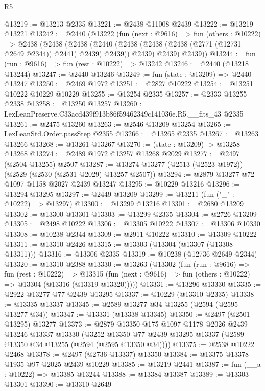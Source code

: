 \begin{lexlean}{R5}
\begin{coremodule}
@13219 := @13213 @2335
@13221 := @2438 @11008 @2439
@13222 := @13219 @13221
@13242 := @2440
    (@13222
      (fun (next : @9616) =>
      fun (others : @10222) =>
      @2438
        (@2438
          (@2438
            (@2440 (@2438 (@2438 (@2438 (@2771 (@12731 @2649 @2344)) @2441) @2439) @2439))
            @2439)
          @2439)
        @2439))
@13244 := fun (run : @9616) => fun (rest : @10222) => @13242
@13246 := @2440 (@13218 @13244)
@13247 := @2440 @13246
@13249 := fun (state : @13209) => @2440 @13247
@13250 := @2469 @1972
@13251 := @2827 @10222
@13254 := @13251 @10222 @10229 @10229
@13255 := @13254 @2335
@13257 := @2333 @13255 @2338
@13258 := @13250 @13257
@13260 := LexLeanPreserve.C33acd439f913b86f59462349c141036e.R5.__fits_43 @2335
@13261 := @2475 @13260
@13263 := @2546 @13209 @13254
@13265 := LexLeanStd.Order.passStep @2355
@13266 := @13265 @2335
@13267 := @13263 @13266
@13268 := @13261 @13267
@13270 := (state : @13209) -> @13258 @13268
@13274 := @2489 @1972 @13257 @13268 @2029
@13277 := @2497 (@2504 @13255) @2507
@13287 := @13274 @13277 (@2513 (@2523 @1972)) (@2529 (@2530 (@2531 @2029) @13257 @2507))
@13294 := @2879 @13277 @72 @1097 @1158 @2027 @2439 @13247
@13295 := @10229 @13216
@13296 := @13294 @13295
@13297 := @2449 @13209
@13299 := @13211 (fun ("_" : @10222) => @13297)
@13300 := @13299 @13216
@13301 := @2680 @13209
@13302 := @13300 @13301
@13303 := @13299 @2335
@13304 := @2726 @13209
@13305 := @2498 @10222
@13306 := @13305 @10222
@13307 := @13306 @10330
@13308 := @10238 @2344
@13309 := @2911 @10222
@13310 := @13309 @10222
@13311 := @13310 @2426
@13315 := @13303 (@13304 (@13307 (@13308 @13311)))
@13316 := @13306 @2335
@13319 := @10238 (@12736 @2649 @2344)
@13320 := @13310 @2388
@13330 := @13263
    (@13302
      (fun (run : @9616) =>
      fun (rest : @10222) =>
      @13315 (fun (next : @9616) => fun (others : @10222) => @13304 (@13316 (@13319 @13320)))))
@13331 := @13296 @13330
@13335 := @2922 @13277 @77 @2439 @13295
@13337 := @10229 (@13310 @2335)
@13338 := @13335 @13337
@13345 := @2589 @13277 @34 @13255 (@2594 (@2595 @13277 @34))
@13347 := @13331 (@13338 @13345)
@13350 := @2497 (@2501 @13295) @13277
@13373 := @2879
    @13350
    @175
    @1097
    @1178
    @2026
    @2439
    @13246
    @13337
    @13330
    (@3252 @13350 @77 @2439 @13295 @13337 (@2589 @13350 @34 @13255 (@2594 (@2595 @13350 @34))))
@13375 := @2538 @10222 @2468
@13378 := @2497 (@2736 @13337) @13350
@13384 := @13375 @13378 @1935 @97 @2025 @2439 @10229
@13385 := @13219 @2441
@13387 := fun (__a : @10222) => @13385 @13244
@13388 := @13384 @13387
@13389 := @13303 @13301
@13390 := @13310 @2649

\end{coremodule}
\end{lexlean}
